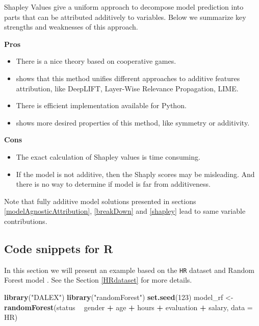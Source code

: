 \documentclass[]{krantz}
\newenvironment{Shaded}{\begin{snugshade}}{\end{snugshade}}
\newcommand{\DataTypeTok}[1]{\textcolor[rgb]{0.13,0.29,0.53}{#1}}
\newcommand{\DecValTok}[1]{\textcolor[rgb]{0.00,0.00,0.81}{#1}}
\newcommand{\KeywordTok}[1]{\textcolor[rgb]{0.13,0.29,0.53}{\textbf{#1}}}
\newcommand{\NormalTok}[1]{#1}
\newcommand{\OperatorTok}[1]{\textcolor[rgb]{0.81,0.36,0.00}{\textbf{#1}}}
\newcommand{\StringTok}[1]{\textcolor[rgb]{0.31,0.60,0.02}{#1}}
\providecommand{\tightlist}{%
  \setlength{\itemsep}{0pt}\setlength{\parskip}{0pt}}
\theoremstyle{definition}
\theoremstyle{definition}
\theoremstyle{definition}
\theoremstyle{remark}
\begin{document}
Shapley Values give a uniform approach to decompose model prediction
into parts that can be attributed additively to variables. Below we
summarize key strengths and weaknesses of this approach.

\textbf{Pros}

\begin{itemize}
\tightlist
\item
  There is a nice theory based on cooperative games.
\item
  \citep{SHAP} shows that this method unifies different approaches to
  additive features attribution, like DeepLIFT, Layer-Wise Relevance
  Propagation, LIME.
\item
  There is efficient implementation available for Python.
\item
  \citep{SHAP} shows more desired properties of this method, like
  symmetry or additivity.
\end{itemize}

\textbf{Cons}

\begin{itemize}
\tightlist
\item
  The exact calculation of Shapley values is time consuming.
\item
  If the model is not additive, then the Shaply scores may be
  misleading. And there is no way to determine if model is far from
  additiveness.
\end{itemize}

Note that fully additive model solutions presented in sections
\ref{modelAgnosticAttribution}, \ref{breakDown} and \ref{shapley} lead
to same variable contributions.

\hypertarget{code-snippets-for-r-2}{%
\subsection{Code snippets for R}\label{code-snippets-for-r-2}}

In this section we will present an example based on the \texttt{HR}
dataset and Random Forest model \citep{R-randomForest}. See the Section
\ref{HRdataset} for more details.

\begin{Shaded}
\begin{Highlighting}[]
\KeywordTok{library}\NormalTok{(}\StringTok{"DALEX"}\NormalTok{)}
\KeywordTok{library}\NormalTok{(}\StringTok{"randomForest"}\NormalTok{)}
\KeywordTok{set.seed}\NormalTok{(}\DecValTok{123}\NormalTok{)}
\NormalTok{model_rf <-}\StringTok{ }\KeywordTok{randomForest}\NormalTok{(status }\OperatorTok{~}\StringTok{ }\NormalTok{gender }\OperatorTok{+}\StringTok{ }\NormalTok{age }\OperatorTok{+}\StringTok{ }\NormalTok{hours }\OperatorTok{+}\StringTok{ }\NormalTok{evaluation }\OperatorTok{+}\StringTok{ }\NormalTok{salary, }\DataTypeTok{data =}\NormalTok{ HR)}
\end{Highlighting}
\end{Shaded}
\end{document}
